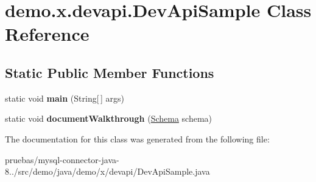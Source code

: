 \hypertarget{classdemo_1_1x_1_1devapi_1_1_dev_api_sample}{}\section{demo.\+x.\+devapi.\+Dev\+Api\+Sample Class Reference}
\label{classdemo_1_1x_1_1devapi_1_1_dev_api_sample}
\subsection*{Static Public Member Functions}
\begin{DoxyCompactItemize}
\item 
\mbox{\label{classdemo_1_1x_1_1devapi_1_1_dev_api_sample_a9fecf4c0145ac4788eb0768d9f1d04a4}} 
static void {\bfseries main} (String\mbox{[}$\,$\mbox{]} args)
\item 
\mbox{\label{classdemo_1_1x_1_1devapi_1_1_dev_api_sample_ada35ae877079026b904c351d57cf454b}} 
static void {\bfseries document\+Walkthrough} (\mbox{\hyperlink{interfacecom_1_1mysql_1_1cj_1_1xdevapi_1_1_schema}{Schema}} schema)
\end{DoxyCompactItemize}


The documentation for this class was generated from the following file\+:\begin{DoxyCompactItemize}
\item 
pruebas/mysql-\/connector-\/java-\/8../src/demo/java/demo/x/devapi/Dev\+Api\+Sample.\+java\end{DoxyCompactItemize}
